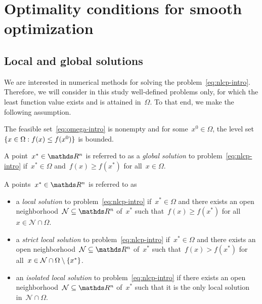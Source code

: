 \section{Optimality conditions for smooth optimization}

\subsection{Local and global solutions}

We are interested in numerical methods for solving the problem~\cref{eq:nlcp-intro}.
Therefore, we will consider in this study well-defined problems only, for which the least function value exists and is attained in~$\Omega$.
To that end, we make the following assumption.

\begin{assumption}
    The feasible set~\cref{eq:omega-intro} is nonempty and for some~$x^0 \in \Omega$, the level set~$\{x \in \Omega : f(x) \le f(x^0)\}$ is bounded.
\end{assumption}

\begin{definition}
    A point~$x^{\ast} \in \R^n$ is referred to as a \emph{global solution} to problem~\cref{eq:nlcp-intro} if~$x^{\ast} \in \Omega$ and~$f(x) \ge f(x^{\ast})$ for all~$x \in \Omega$.
\end{definition}

\begin{definition}
    A points~$x^{\ast} \in \R^n$ is referred to as
    \begin{itemize}
        \item a \emph{local solution} to problem~\cref{eq:nlcp-intro} if~$x^{\ast} \in \Omega$ and there exists an open neighborhood~$\mathcal{N} \subseteq \R^n$ of~$x^{\ast}$ such that~$f(x) \ge f(x^{\ast})$ for all~$x \in \mathcal{N} \cap \Omega$.
        \item a \emph{strict local solution} to problem~\cref{eq:nlcp-intro} if~$x^{\ast} \in \Omega$ and there exists an open neighborhood~$\mathcal{N} \subseteq \R^n$ of~$x^{\ast}$ such that~$f(x) > f(x^{\ast})$ for all~$x \in \mathcal{N} \cap \Omega \setminus \{x^{\ast}\}$.
        \item an \emph{isolated local solution} to problem~\cref{eq:nlcp-intro} if there exists an open neighborhood~$\mathcal{N} \subseteq \R^n$ of~$x^{\ast}$ such that it is the only local solution in~$\mathcal{N} \cap \Omega$.
    \end{itemize}
\end{definition}


